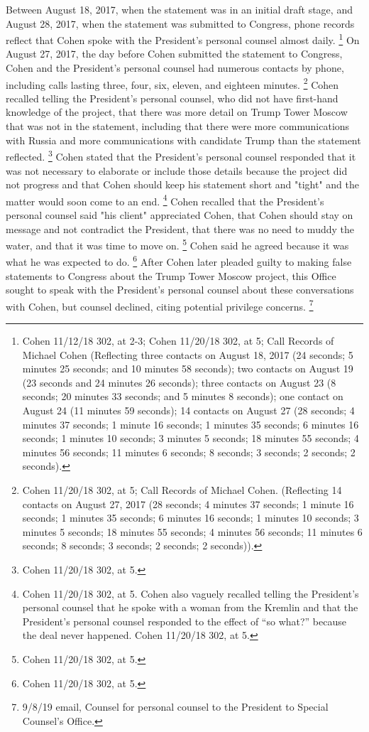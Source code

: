 Between August 18, 2017, when the statement was in an initial draft stage, and August 28, 2017, when the statement was submitted to Congress, phone records reflect that Cohen spoke with the President's personal counsel almost daily.%
\footnote{Cohen 11/12/18 302, at 2-3;
Cohen 11/20/18 302, at 5;
Call Records of Michael Cohen (Reflecting three contacts on August 18, 2017 (24 seconds;
5 minutes 25 seconds;
and 10 minutes 58 seconds);
two contacts on August 19 (23 seconds and 24 minutes 26 seconds);
three contacts on August 23 (8 seconds; 20 minutes 33 seconds;
and 5 minutes 8 seconds);
one contact on August 24 (11 minutes 59 seconds);
14 contacts on August 27 (28 seconds;
4 minutes 37 seconds;
1 minute 16 seconds;
1 minutes 35 seconds;
6 minutes 16 seconds;
1 minutes 10 seconds;
3 minutes 5 seconds;
18 minutes 55 seconds;
4 minutes 56 seconds;
11 minutes 6 seconds;
8 seconds;
3 seconds;
2 seconds;
2 seconds).}
On August 27, 2017, the day before Cohen submitted the statement to Congress, Cohen and the President's personal counsel had numerous contacts by phone, including calls lasting three, four, six, eleven, and eighteen minutes.%
\footnote{Cohen 11/20/18 302, at 5;
Call Records of Michael Cohen.
(Reflecting 14 contacts on August 27, 2017 (28 seconds;
4 minutes 37 seconds;
1 minute 16 seconds;
1 minutes 35 seconds;
6 minutes 16 seconds;
1 minutes 10 seconds;
3 minutes 5 seconds;
18 minutes 55 seconds;
4 minutes 56 seconds;
11 minutes 6 seconds;
8 seconds;
3 seconds;
2 seconds;
2 seconds)).
}
Cohen recalled telling the President's personal counsel, who did not have first-hand knowledge of the project, that there was more detail on Trump Tower Moscow that was not in the statement, including that there were more communications with Russia and more communications with candidate Trump than the statement reflected.%
\footnote{Cohen 11/20/18 302, at 5.}
Cohen stated that the President's personal counsel responded that it was not necessary to elaborate or include those details because the project did not progress and that Cohen should keep his statement short and "tight" and the matter would soon come to an end.%
\footnote{Cohen 11/20/18 302, at 5.
Cohen also vaguely recalled telling the President’s personal counsel that he spoke with a woman from the Kremlin and that the President’s personal counsel responded to the effect of “so what?” because the deal never happened.
Cohen 11/20/18 302, at 5.}
Cohen recalled that the President's personal counsel said "his client" appreciated Cohen, that Cohen should stay on message and not contradict the President, that there was no need to muddy the water, and that it was time to move on.%
\footnote{Cohen 11/20/18 302, at 5.}
Cohen said he agreed because it was what he was expected to do.%
\footnote{Cohen 11/20/18 302, at 5.}
After Cohen later pleaded guilty to making false statements to Congress about the Trump Tower Moscow project, this Office sought to speak with the President's personal counsel about these conversations with Cohen, but counsel declined, citing potential privilege concerns.%
\footnote{9/8/19 email, Counsel for personal counsel to the President to Special Counsel’s Office.}

